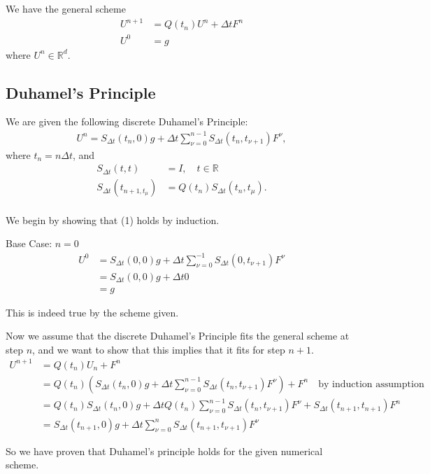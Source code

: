 We have the general scheme 
\begin{align*}
U^{n+1}  &= Q(t_n) U^n + \Delta t F^n \\
U^0 &= g
\end{align*}
where $U^n \in \mathbb{R}^d$. 

\subsection{Duhamel’s Principle}
We are given the following discrete Duhamel’s Principle:
\begin{align}
U^n = S_{\Delta t}(t_n,0)g+\Delta t \sum_{\nu = 0}^{n-1} S_{\Delta t}(t_n , t_{\nu + 1}) F^{\nu} , 
\end{align}
where $t_n = n \Delta t$, and 
\begin{align*}
S_{\Delta t}(t,t) &= I, \quad t \in \mathbb{R} \\
S_{\Delta t}(t_{n+1,t_{\mu}}) &= Q(t_n)S_{\Delta t}(t_n,t_{\mu}).
\end{align*}
\\
We begin by showing that (1) holds by induction.

Base Case: $n = 0$
\begin{align*}
U^0 & = S_{\Delta t}(0,0)g+\Delta t \sum_{\nu = 0}^{-1} S_{\Delta t}(0 , t_{\nu + 1}) F^{\nu} \\
&= S_{\Delta t}(0,0)g+\Delta t 0 \\
&= g
\end{align*}

This is indeed true by the scheme given.
 
Now we assume that the discrete Duhamel's Principle fits the general scheme at step $n$, and we want to show that this implies that it fits for step $n+1$.
\begin{align*}
U^{n+1} &= Q(t_n)U_n+F^{n} \\ 
&= Q(t_n)(S_{\Delta t}(t_n,0)g + \Delta t \sum_{\nu = 0}^{n-1} S_{\Delta t}(t_n , t_{\nu + 1}) F^{\nu})+F^{n} \quad \text{by induction assumption} \\ 
&= Q(t_n)S_{\Delta t}(t_n,0)g + \Delta t Q(t_n) \sum_{\nu = 0}^{n-1} S_{\Delta t}(t_n , t_{\nu + 1}) F^{\nu} + S_{\Delta t}(t_{n+1} , t_{n + 1}) F^{n} \\ 
&= S_{\Delta t}(t_{n+1},0)g+\Delta t \sum_{\nu = 0}^{n} S_{\Delta t}(t_{n+1} , t_{\nu + 1}) F^{\nu}
\end{align*}

So we have proven that Duhamel's principle holds for the given numerical scheme.

